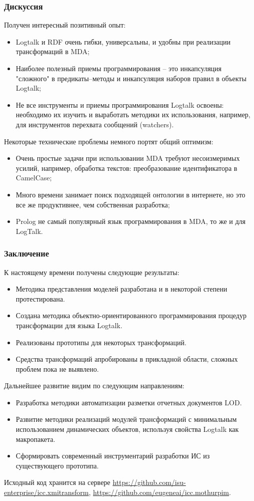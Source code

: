 \documentclass[10pt]{beamer}
\begin{document}
\begin{frame} \frametitle{Дискуссия} Получен интересный позитивный опыт: \begin{itemize} \item Logtalk и RDF очень гибки, универсальны, и удобны при реализации трансформаций в MDA; \item Наиболее полезный приемы программирования -- это инкапсуляция "сложного" в предикаты--методы и инкапсуляция наборов правил в объекты Logtalk; \item Не все инструменты и приемы программирования Logtalk освоены: необходимо их изучить и выработать методики их использования, например, для инструментов перехвата сообщений (watchers). \end{itemize} Некоторые технические проблемы немного портят общий оптимизм: \begin{itemize} \item Очень простые задачи при использовании MDA требуют несоизмеримых усилий, например, обработка текстов: преобразование идентификатора в CamelCase; \item Много времени занимает поиск подходящей онтологии в интернете, но это все же продуктивнее, чем собственная разработка; \item Prolog не самый популярный язык программирования в MDA, то же и для LogTalk. \end{itemize} \end{frame}

\begin{frame} \frametitle{Заключение} К настоящему времени получены следующие результаты: \begin{itemize} \item Методика представления моделей разработана и в некоторой степени протестирована. \item Создана методика объектно-ориентированного программирования процедур трансформации для языка Logtalk. \item Реализованы прототипы для некоторых трансформаций. \item Средства трансформаций апробированы в прикладной области, сложных проблем пока не выявлено. \end{itemize} Дальнейшее развитие видим по следующим направлениям: \begin{itemize} \item Разработка методики автоматизации разметки отчетных документов LOD. \item Развитие методики реализаций модулей трансформаций с минимальным использованием динамических объектов, используя свойства Logtalk как макропакета. \item Сформировать современный инструментарий разработки ИС из существующего прототипа. \end{itemize}
 Исходный код хранится на сервере \url{https://github.com/isu-enterprise/icc.xmitransform}, \url{https://github.com/eugeneai/icc.mothurpim}.
\end{frame}
\end{document}
